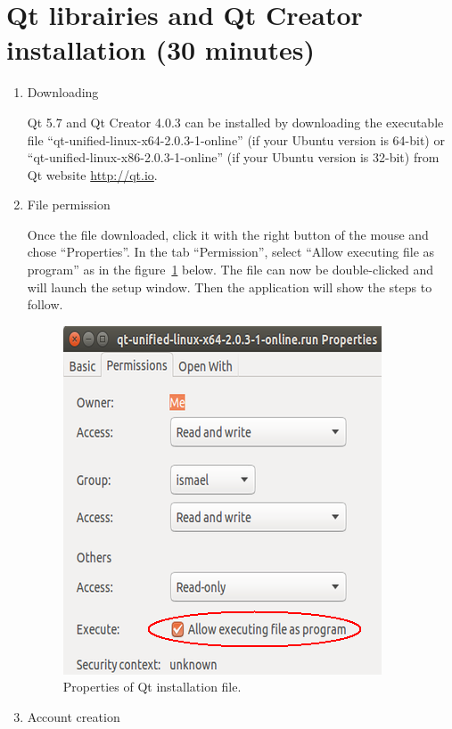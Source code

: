 \documentclass[12pt]{report}
\begin{document}
\section{Qt librairies and Qt Creator installation (30 minutes)}
\begin{enumerate}
\item Downloading

Qt 5.7 and Qt Creator 4.0.3 can be installed by downloading the executable file ``qt-unified-linux-x64-2.0.3-1-online'' (if your Ubuntu version is 64-bit) or ``qt-unified-linux-x86-2.0.3-1-online'' (if your Ubuntu version is 32-bit) from Qt website \url{http://qt.io}.

\item File permission

Once the file downloaded, click it with the right button of the mouse and chose ``Properties''. In the tab ``Permission'', select ``Allow executing file as program'' as in the figure~\ref{qt-install-1} below. The file can now be double-clicked and will launch the setup window. Then the application will show the steps to follow.

\vspace{10pt}
\begin{figure}[H]
\centerline{\includegraphics[scale = 0.5]{img/Qt-install-1.png}}
\caption{Properties of Qt installation file.}
\label{qt-install-1}
\end{figure}
\vspace{10pt}

\item Account creation


\end{enumerate}
\end{document}
